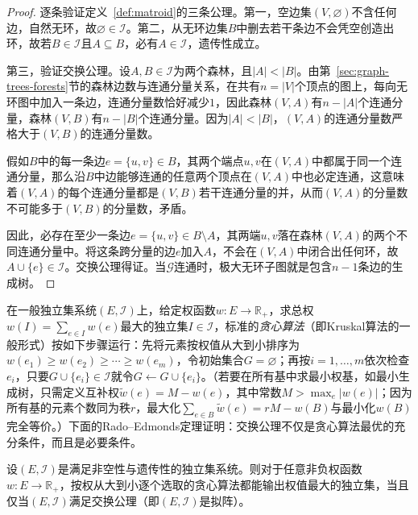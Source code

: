 \begin{proof}
逐条验证定义~\ref{def:matroid}的三条公理。第一，空边集$(V,\varnothing)$不含任何边，自然无环，故$\varnothing\in\mathcal I$。第二，从无环边集$B$中删去若干条边不会凭空创造出环，故若$B\in\mathcal I$且$A\subseteq B$，必有$A\in\mathcal I$，遗传性成立。

第三，验证交换公理。设$A,B\in\mathcal I$为两个森林，且$|A|<|B|$。由第~\ref{sec:graph-trees-forests}节的森林边数与连通分量关系，在共有$n=|V|$个顶点的图上，每向无环图中加入一条边，连通分量数恰好减少$1$，因此森林$(V,A)$有$n-|A|$个连通分量，森林$(V,B)$有$n-|B|$个连通分量。因为$|A|<|B|$，$(V,A)$的连通分量数严格大于$(V,B)$的连通分量数。

假如$B$中的每一条边$e=\{u,v\}\in B$，其两个端点$u,v$在$(V,A)$中都属于同一个连通分量，那么沿$B$中边能够连通的任意两个顶点在$(V,A)$中也必定连通，这意味着$(V,A)$的每个连通分量都是$(V,B)$若干连通分量的并，从而$(V,A)$的分量数不可能多于$(V,B)$的分量数，矛盾。

因此，必存在至少一条边$e=\{u,v\}\in B\setminus A$，其两端$u,v$落在森林$(V,A)$的两个不同连通分量中。将这条跨分量的边$e$加入$A$，不会在$(V,A)$中闭合出任何环，故$A\cup\{e\}\in\mathcal I$。交换公理得证。当$\mathcal G$连通时，极大无环子图就是包含$n-1$条边的生成树。
\end{proof}

在一般独立集系统$(E,\mathcal I)$上，给定权函数$w:E\to\mathbb R_+$，求总权$w(I)=\sum_{e\in I}w(e)$最大的独立集$I\in\mathcal I$，标准的\emph{贪心算法}（即Kruskal算法的一般形式）按如下步骤运行：先将元素按权值从大到小排序为$w(e_1)\geq w(e_2)\geq\cdots\geq w(e_m)$，令初始集合$G=\varnothing$；再按$i=1,\ldots,m$依次检查$e_i$，只要$G\cup\{e_i\}\in\mathcal I$就令$G\gets G\cup\{e_i\}$。（若要在所有基中求最小权基，如最小生成树，只需定义互补权$\tilde w(e)=M-w(e)$，其中常数$M>\max_e|w(e)|$；因为所有基的元素个数同为秩$r$，最大化$\sum_{e\in B}\tilde w(e)=rM-w(B)$与最小化$w(B)$完全等价。）下面的Rado--Edmonds定理证明：交换公理不仅是贪心算法最优的充分条件，而且是必要条件。

\begin{theorem}
\label{thm:mst-matroid-greedy}
设$(E,\mathcal I)$是满足非空性与遗传性的独立集系统。则对于任意非负权函数$w:E\to\mathbb R_+$，按权从大到小逐个选取的贪心算法都能输出权值最大的独立集，当且仅当$(E,\mathcal I)$满足交换公理（即$(E,\mathcal I)$是拟阵）。
\end{theorem}

